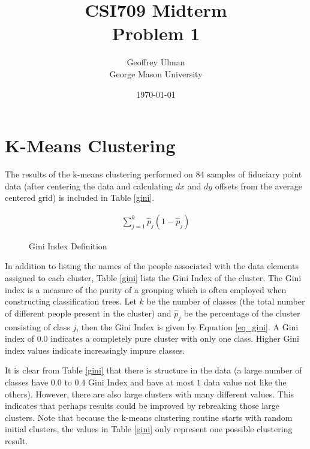 \documentclass[12pt]{article}
\begin{document}
\title{CSI709 Midterm \\
Problem 1}
\author{
        Geoffrey Ulman \\
        George Mason University\\
}
\date{\today}

\maketitle

\section{K-Means Clustering}

The results of the k-means clustering performed on 84 samples of fiduciary point data (after centering the data and calculating \(dx\) and \(dy\) offsets from the average centered grid) is included in Table \ref{gini}.

\begin{figure}
\begin{equation}\label{eq_gini}
\begin{aligned}
\sum_{j=1}^{k} \hat{p}_j\left ( 1 - \hat{p}_j \right )
\end{aligned}
\end{equation}
\caption{Gini Index Definition}
\end{figure}

In addition to listing the names of the people associated with the data elements assigned to each cluster, Table \ref{gini} lists the Gini Index of the cluster. The Gini index is a measure of the purity of a grouping which is often employed when constructing classification trees. Let \(k\) be the number of classes (the total number of different people present in the cluster) and \(\hat{p}_j\) be the percentage of the cluster consisting of class \(j\), then the Gini Index is given by Equation \ref{eq_gini}. A Gini index of \(0.0\) indicates a completely pure cluster with only one class. Higher Gini index values indicate increasingly impure classes.

It is clear from Table \ref{gini} that there is structure in the data (a large number of classes have \(0.0\) to \(0.4\) Gini Index and have at most \(1\) data value not like the others). However, there are also large clusters with many different values. This indicates that perhaps results could be improved by rebreaking those large clusters. Note that because the k-means clustering routine starts with random initial clusters, the values in Table \ref{gini} only represent one possible clustering result.
\end{document}
